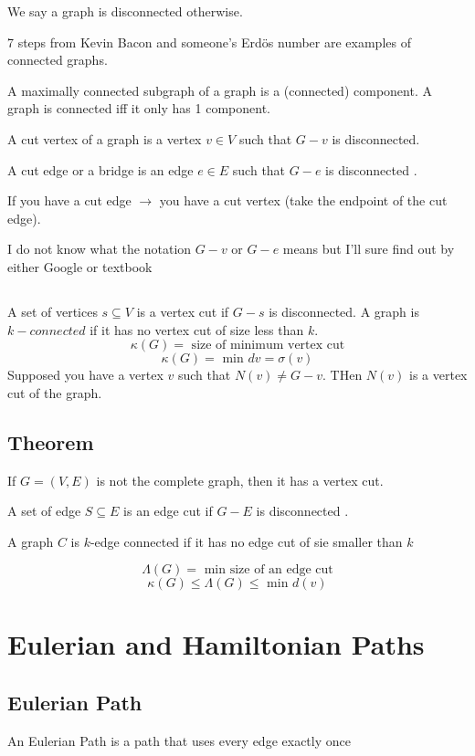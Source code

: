 \documentclass{report}
\begin{document}
We say a graph is disconnected otherwise.

7 steps from Kevin Bacon and someone's Erdös number are examples of connected graphs.

A maximally connected subgraph of a graph is a (connected) component.  A graph is connected iff it only has 1 component.

A cut vertex of a graph is a vertex $v \in V$ such that $G - v$ is disconnected.

A cut edge or a bridge is an edge $e \in E$ such that $G - e$ is disconnected .

If you have a cut edge $\rightarrow$ you have a cut vertex (take the endpoint of the cut edge).

I do not know what the notation $G - v$ or $G - e$ means but I'll sure find out by either Google or textbook

\section{}
A set of vertices $s \subseteq V$ is a vertex cut if $G - s$ is disconnected.  A graph is $k-connected$ if it has no vertex cut of size less than $k$.
\[
\kappa (G) = \textrm{ size of minimum vertex cut}
\]
\[
\kappa (G) = \textrm{ min } dv = \sigma (v)
\]
Supposed you have a vertex $v$ such that $N(v) \neq G - v$. THen $N(v)$ is a vertex cut of the graph.

\section{Theorem}
If $G = (V, E)$ is not the complete graph, then it has a vertex cut.

A set of edge $S \subseteq E$ is an edge cut if $G - E$ is disconnected .

A graph $C$ is $k$-edge connected if it has no edge cut of sie smaller than $k$

\[
\Lambda (G) = \textrm{ min size of an edge cut}
\]
\[
\kappa (G) \leq \Lambda (G) \leq \textrm{ min } d(v)
\]


\chapter{Eulerian and Hamiltonian Paths}
\section{Eulerian Path}
An Eulerian Path is a path that uses every edge exactly once
\end{document}
